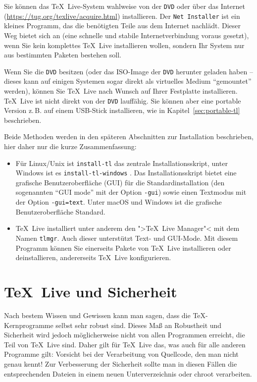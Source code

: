 \documentclass[12pt,ngerman,a4paper,fullparskip]{scrreprt}
\newcommand{\TL}{\TeX\ Live\xspace}
\newcommand{\acro}[1]{\texttt{#1}}
\newcommand{\cmdname}[1]{\texttt{#1}}
\newcommand{\code}[1]{\texttt{#1}}
\newcommand{\prog}[1]{\texttt{#1}}
\providecommand*{\DVD}{\acro{DVD}\xspace}
\providecommand*{\macOS}{macOS\xspace}
\begin{document}
Sie können das \TL-System wahlweise von der \DVD oder über das
Internet (\url{https://tug.org/texlive/acquire.html}) installieren.
Der \prog{Net Installer} ist ein kleines Programm,
das die benötigten Teile aus dem Internet nachlädt. Dieser Weg bietet
sich an (eine schnelle und stabile Internetverbindung voraus gesetzt),
wenn Sie kein komplettes \TL{} installieren wollen, sondern Ihr System nur
aus bestimmten Paketen bestehen soll.

Wenn Sie die \DVD{} besitzen (oder das ISO-Image der \DVD{} herunter
geladen haben -- dieses kann auf einigen Systemen sogar direkt als
virtuelles Medium \enquote{gemountet} werden), können Sie \TL{} nach
Wunsch auf Ihrer Festplatte installieren. \TL{} ist nicht direkt von der \DVD{} lauffähig. Sie können aber eine portable Version z.\,B. auf einem USB-Stick installieren, wie in Kapitel~\ref{sec:portable-tl} beschrieben.

Beide Methoden werden in den späteren Abschnitten zur Installation beschrieben, hier daher nur die kurze Zusammenfassung:

\begin{itemize}
\item Für Linux/Unix ist \cmdname{install-tl} das zentrale Installationsskript, unter Windows ist es \cmdname{install-tl-windows}  . Das Installationsskript bietet eine grafische Benutzeroberfläche (GUI) für die Standardinstallation  (den sogenannten \enquote{GUI mode} mit der Option \code{-gui}) sowie einen  Textmodus  mit der Option \code{-gui=text}. Unter \macOS und Windows ist die grafische Benutzeroberfläche Standard. 

\item \TL installiert unter anderem den ">\TL Manager"< mit dem Namen
\prog{tlmgr}. Auch dieser unterstützt Text- und GUI-Mode. Mit diesem
Programm können Sie einerseits Pakete von \TL installieren oder deinstallieren,
andererseits \TL konfigurieren.
\end{itemize}

\section{\TL und Sicherheit}

Nach bestem Wissen und Gewissen kann man sagen, dass die \TeX-Kernprogramme selbst sehr robust sind. Dieses Maß an Robustheit und Sicherheit wird jedoch möglicherweise nicht von allen Programmen erreicht, die Teil von \TL sind. Daher gilt für \TL das, was auch für alle anderen Programme gilt: Vorsicht bei der Verarbeitung von Quellcode, den man nicht genau kennt! Zur Verbesserung der Sicherheit sollte man in diesen Fällen die entsprechenden Dateien in einem neuen Unterverzeichnis oder chroot verarbeiten.
\end{document}
